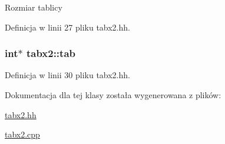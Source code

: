 Rozmiar tablicy 

Definicja w linii 27 pliku tabx2.\-hh.

\hypertarget{classtabx2_ae3ee40d58c1d3dc6a80c34ca63d337e9}{
\subsubsection[{tab}]{\setlength{\rightskip}{0pt plus 5cm}int$\ast$ tabx2\-::tab\hspace{0.3cm}{\ttfamily [private]}}}\label{classtabx2_ae3ee40d58c1d3dc6a80c34ca63d337e9}


Definicja w linii 30 pliku tabx2.\-hh.



Dokumentacja dla tej klasy została wygenerowana z plików\-:\begin{DoxyCompactItemize}
\item 
\hyperlink{tabx2_8hh}{tabx2.\-hh}\item 
\hyperlink{tabx2_8cpp}{tabx2.\-cpp}\end{DoxyCompactItemize}
